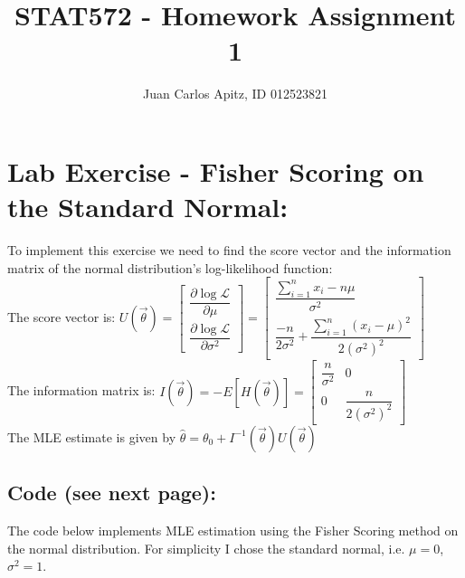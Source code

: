 \documentclass[12pt,a4paper]{article}
\author{Juan Carlos Apitz, ID 012523821}
\title{STAT572 - Homework Assignment 1}
\begin{document}
\maketitle

\section*{Lab Exercise - Fisher Scoring on the Standard Normal:}
To implement this exercise we need to find the score vector and the information matrix of the normal distribution's log-likelihood function:\\
The score vector is:
$U(\vec{\theta})=\begin{bmatrix}
\dfrac{\partial \log \mathcal{L}}{\partial \mu} \\ 
\dfrac{\partial \log \mathcal{L}}{\partial \sigma^2} 
\end{bmatrix}=
\begin{bmatrix}
\dfrac{\sum_{i=1}^n x_i - n\mu}{\sigma^2} \\ 
\dfrac{-n}{2\sigma^2}+\dfrac{\sum_{i=1}^n(x_i-\mu)^2}{2(\sigma^2)^2} 
\end{bmatrix}$\\
The information matrix is: $I(\vec{\theta})=-E[H(\vec{\theta})]=
\begin{bmatrix}
\dfrac{n}{\sigma^2} & 0 \\ 
0 & \dfrac{n}{2(\sigma^2)^2} 
\end{bmatrix}$\\
The MLE estimate is given by $\hat{\theta}=\theta_0+I^{-1}(\vec{\theta})U(\vec{\theta})$

\subsection*{Code (see next page):}

The code below implements MLE estimation using the Fisher Scoring method on the normal distribution. For simplicity I chose the standard normal, i.e. $\mu=0$, $\sigma^2=1$.
\end{document}
